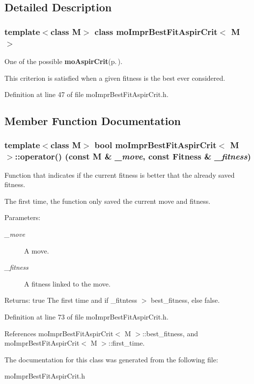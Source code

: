 \subsection{Detailed Description}
\subsubsection*{template$<$class M$>$ class mo\-Impr\-Best\-Fit\-Aspir\-Crit$<$ M $>$}

One of the possible {\bf mo\-Aspir\-Crit}{\rm (p.\,\pageref{classmo_aspir_crit})}. 

This criterion is satisfied when a given fitness is the best ever considered. 



Definition at line 47 of file mo\-Impr\-Best\-Fit\-Aspir\-Crit.h.

\subsection{Member Function Documentation}
\subsubsection{\setlength{\rightskip}{0pt plus 5cm}template$<$class M$>$ bool {\bf mo\-Impr\-Best\-Fit\-Aspir\-Crit}$<$ M $>$::operator() (const M \& {\em \_\-move}, const {\bf Fitness} \& {\em \_\-fitness})\hspace{0.3cm}{\tt  [inline]}}\label{classmo_impr_best_fit_aspir_crit_a2}


Function that indicates if the current fitness is better that the already saved fitness. 

The first time, the function only saved the current move and fitness.

\begin{Desc}
\item[Parameters:]
\begin{description}
\item[{\em \_\-move}]A move. \item[{\em \_\-fitness}]A fitness linked to the move. \end{description}
\end{Desc}
\begin{Desc}
\item[Returns:]true The first time and if \_\-fitntess $>$ best\_\-fitness, else false. \end{Desc}


Definition at line 73 of file mo\-Impr\-Best\-Fit\-Aspir\-Crit.h.

References mo\-Impr\-Best\-Fit\-Aspir\-Crit$<$ M $>$::best\_\-fitness, and mo\-Impr\-Best\-Fit\-Aspir\-Crit$<$ M $>$::first\_\-time.

The documentation for this class was generated from the following file:\begin{CompactItemize}
\item 
mo\-Impr\-Best\-Fit\-Aspir\-Crit.h\end{CompactItemize}
